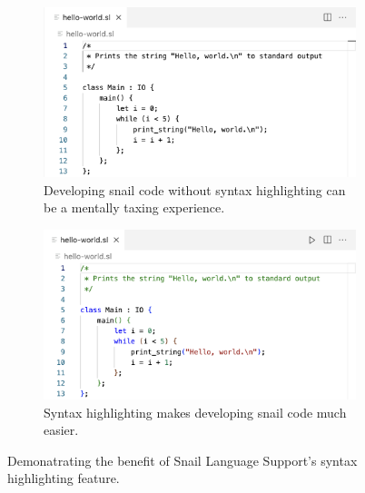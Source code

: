 \documentclass{article}
\begin{document}
\begin{figure}[b]
    \begin{subfigure}[c][][c]{0.45\textwidth}
        \begin{center}
            \includegraphics[width=\textwidth]{screenshots/dev-no-highlight-light.png}
            \caption{Developing snail code without syntax highlighting can be a mentally taxing experience.}
            \label{fig:dev-no-highlight}
        \end{center}
    \end{subfigure}
    \hspace{0.05\textwidth}
    \begin{subfigure}[c][][c]{0.45\textwidth}
        \begin{center}
            \includegraphics[width=\textwidth]{screenshots/dev-with-highlight-light.png}
            \caption{Syntax highlighting makes developing snail code much easier.}
            \label{fig:dev-with-highlight}
        \end{center}
    \end{subfigure}
    \caption{Demonatrating the benefit of Snail Language Support's syntax highlighting feature.}
    \label{fig:syntax-highlight}
\end{figure}
\end{document}
